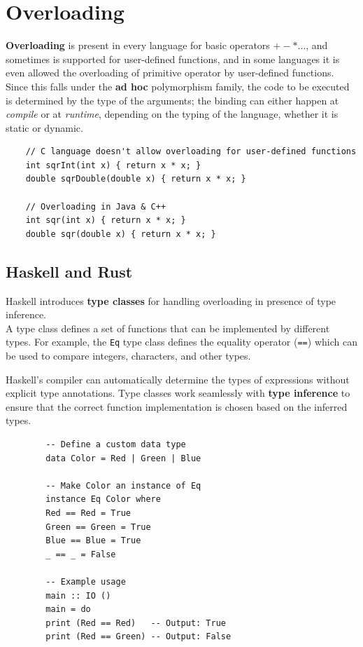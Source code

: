 \section{Overloading}
\textbf{Overloading} is present in every language for basic operators $+-*...$,
and sometimes is supported for user-defined functions, 
and in some languages it is even allowed the overloading of primitive operator by user-defined functions.\\
Since this falls under the \textbf{ad hoc} polymorphism family,
the code to be executed is determined by the type of the arguments;
the binding can either happen at \textit{compile} or at \textit{runtime},
depending on the typing of the language,
whether it is static or dynamic.

\begin{lstlisting}
    // C language doesn't allow overloading for user-defined functions
    int sqrInt(int x) { return x * x; }
    double sqrDouble(double x) { return x * x; }
    
    // Overloading in Java & C++
    int sqr(int x) { return x * x; }
    double sqr(double x) { return x * x; }
\end{lstlisting}

\subsection{Haskell and Rust}
\lstset{language=Haskell, basicstyle=\footnotesize\ttfamily}
\begin{paracol}{2}

    Haskell introduces \textbf{type classes} for handling
    overloading in presence of type inference.\\
    A type class defines a set of functions that can be implemented by different types. For example, the \lstinline|Eq| type class defines the equality operator (\lstinline|==|) which can be used to compare integers, characters, and other types.
    
    Haskell's compiler can automatically determine the types of expressions without explicit type annotations. Type classes work seamlessly with \textbf{type inference} to ensure that the correct function implementation is chosen based on the inferred types.
    \switchcolumn
    
    
    \begin{lstlisting}
        -- Define a custom data type
        data Color = Red | Green | Blue
        
        -- Make Color an instance of Eq
        instance Eq Color where
        Red == Red = True
        Green == Green = True
        Blue == Blue = True
        _ == _ = False
        
        -- Example usage
        main :: IO ()
        main = do
        print (Red == Red)   -- Output: True
        print (Red == Green) -- Output: False
    \end{lstlisting}
\end{paracol}
    

